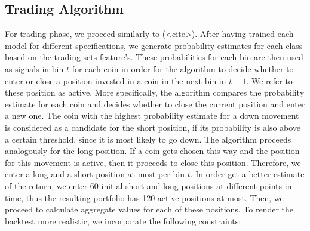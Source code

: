 \subsection{Trading Algorithm} \label{ch:trading_algorithm}
For trading phase, we proceed similarly to (<cite>).
After having trained each model for different specifications, we generate probability estimates for each class
based on the trading sets feature's. These probabilities for each bin are then used as signals in bin $t$ for each coin
in order for the algorithm to decide whether to enter or close a position invested in a coin in the next bin in $ t + 1 $.
We refer to these position as active.
More specifically, the algorithm compares the probability estimate for each coin and decides 
whether to close the current position and enter a new one. The coin with the highest probability estimate for a down movement
is considered as a candidate for the short position, if its probability is also above a certain threshold,
since it is most likely to go down. 
The algorithm proceeds analogously for the long position. 
If a coin gets chosen this way and the position for this movement is active, then it proceeds to close this position.
Therefore, we enter a long and a short position at most per bin $ t $.
In order get a better estimate of the return, we enter 60 initial short and long positions at different points in time,
thus the resulting portfolio has 120 active positions at most.
Then, we proceed to calculate aggregate values for each of these positions. To render the backtest more
realistic, we incorporate the following constraints:

